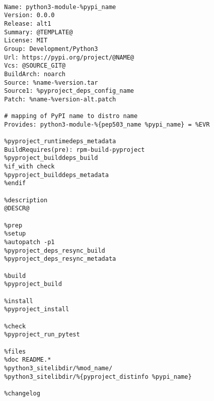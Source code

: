 \begin{enumerate}
\begin{Verbatim}[breaklines=true,breakanywhere=true,xleftmargin=-2.95cm]
		%def_with check
		
		Name: python3-module-%pypi_name
		Version: 0.0.0
		Release: alt1
		Summary: @TEMPLATE@
		License: MIT
		Group: Development/Python3
		Url: https://pypi.org/project/@NAME@
		Vcs: @SOURCE_GIT@
		BuildArch: noarch
		Source: %name-%version.tar
		Source1: %pyproject_deps_config_name
		Patch: %name-%version-alt.patch
		
		# mapping of PyPI name to distro name
		Provides: python3-module-%{pep503_name %pypi_name} = %EVR
		
		%pyproject_runtimedeps_metadata
		BuildRequires(pre): rpm-build-pyproject
		%pyproject_builddeps_build
		%if_with check
		%pyproject_builddeps_metadata
		%endif
		
		%description
		@DESCR@
		
		%prep
		%setup
		%autopatch -p1
		%pyproject_deps_resync_build
		%pyproject_deps_resync_metadata
		
		%build
		%pyproject_build
		
		%install
		%pyproject_install
		
		%check
		%pyproject_run_pytest
		
		%files
		%doc README.*
		%python3_sitelibdir/%mod_name/
		%python3_sitelibdir/%{pyproject_distinfo %pypi_name}
		
		%changelog
	\end{Verbatim}
\end{enumerate}
